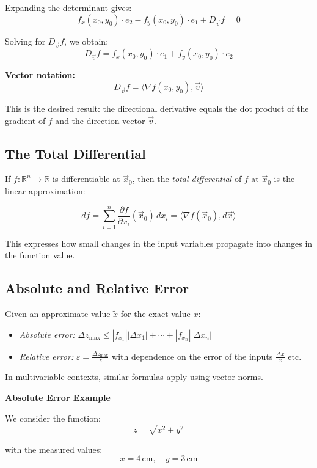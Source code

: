 Expanding the determinant gives:
\[
f_x(x_0, y_0) \cdot e_2 - f_y(x_0, y_0) \cdot e_1 + D_{\vec{v}}f = 0
\]

Solving for \( D_{\vec{v}}f \), we obtain:
\[
D_{\vec{v}}f = f_x(x_0, y_0) \cdot e_1 + f_y(x_0, y_0) \cdot e_2
\]

\textbf{Vector notation:}
\[
D_{\vec{v}}f = \langle \nabla f(x_0, y_0), \vec{v} \rangle
\]

This is the desired result: the directional derivative equals the dot product of the gradient of \( f \) and the direction vector \( \vec{v} \).

\subsection{The Total Differential}

If \( f : \mathbb{R}^n \to \mathbb{R} \) is differentiable at \( \vec{x}_0 \), then the 
\emph{total differential} of \( f \) at \( \vec{x}_0 \) is the linear approximation:

\[
df = \sum_{i=1}^n \frac{\partial f}{\partial x_i}(\vec{x}_0) \, dx_i = \langle \nabla f(\vec{x}_0), d\vec{x} \rangle
\]

This expresses how small changes in the input variables propagate into changes in the function value.


\subsection{Absolute and Relative Error}

Given an approximate value \( \tilde{x} \) for the exact value \( x \):

\begin{itemize}[label=\(-\)]
\item \emph{Absolute error:} \(\Delta z_{\max} \le |f_{x_1}||\Delta x_1| + \cdots + |f_{x_n}||\Delta x_n| \)
\item \emph{Relative error:} \( \varepsilon = \frac{\Delta z_{\max}}{z}\) with dependence on the error of the inputs \(\frac{\Delta x}{x}\) etc.
\end{itemize}

In multivariable contexts, similar formulas apply using vector norms.

\textbf{Absolute Error Example}

We consider the function:
\[
z = \sqrt{x^2 + y^2}
\]

with the measured values:
\[
x = 4 \, \text{cm}, \quad y = 3 \, \text{cm}
\]

